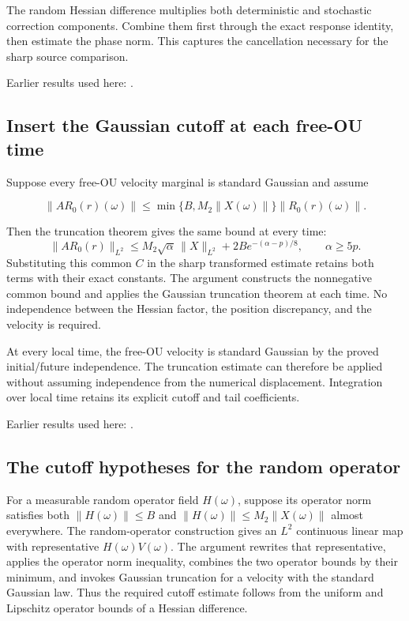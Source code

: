 \documentclass[11pt,a4paper]{report}
\begin{document}
The random Hessian difference multiplies both deterministic and stochastic correction components. Combine them first through the exact response identity, then estimate the phase norm. This captures the cancellation necessary for the sharp source comparison.



Earlier results used here: \cite[Section~3.8.17]{LangevinLean2026ULASC}.
\subsection{\texorpdfstring{Insert the Gaussian cutoff at each free-OU time}{Insert the Gaussian cutoff at each free-OU time}}
\label{report-step-KineticLangevin-FreeOUCorrectionBound-lean-3}


Suppose every free-OU velocity marginal is standard Gaussian and assume

\[\|AR_0(r)(\omega)\|\le\min\{B,M_2\|X(\omega)\|\}\|R_0(r)(\omega)\|.\]

Then the truncation theorem gives the same bound at every time: \[\|AR_0(r)\|_{L^2}\le M_2\sqrt\alpha\,\|X\|_{L^2}+2B e^{-(\alpha-p)/8},\qquad\alpha\ge5p.\] Substituting this common \(C\) in the sharp transformed estimate retains both terms with their exact constants. The argument constructs the nonnegative common bound and applies the Gaussian truncation theorem at each time. No independence between the Hessian factor, the position discrepancy, and the velocity is required.



At every local time, the free-OU velocity is standard Gaussian by the proved initial/\allowbreak{}future independence. The truncation estimate can therefore be applied without assuming independence from the numerical displacement. Integration over local time retains its explicit cutoff and tail coefficients.



Earlier results used here: \cite[Section~3.8.17]{LangevinLean2026ULASC}.
\subsection{\texorpdfstring{The cutoff hypotheses for the random operator}{The cutoff hypotheses for the random operator}}
\label{report-step-KineticLangevin-FreeOUCorrectionBound-lean-4}


For a measurable random operator field \(H(\omega)\), suppose its operator norm satisfies both \(\|H(\omega)\|\le B\) and \(\|H(\omega)\|\le M_2\|X(\omega)\|\) almost everywhere. The random-operator construction gives an \(L^{2}\) continuous linear map with representative \(H(\omega)V(\omega)\). The argument rewrites that representative, applies the operator norm inequality, combines the two operator bounds by their minimum, and invokes Gaussian truncation for a velocity with the standard Gaussian law. Thus the required cutoff estimate follows from the uniform and Lipschitz operator bounds of a Hessian difference.
\end{document}
